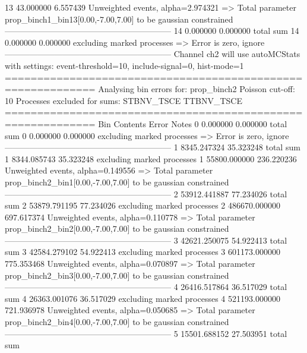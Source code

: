 13         43.000000       6.557439        Unweighted events, alpha=2.974321
  => Total parameter prop_binch1_bin13[0.00,-7.00,7.00] to be gaussian constrained
------------------------------------------------------------
14         0.000000        0.000000        total sum                     
14         0.000000        0.000000        excluding marked processes    
  => Error is zero, ignore      
------------------------------------------------------------
Channel ch2 will use autoMCStats with settings: event-threshold=10, include-signal=0, hist-mode=1
============================================================
Analysing bin errors for: prop_binch2
Poisson cut-off: 10
Processes excluded for sums: STBNV_TSCE TTBNV_TSCE
============================================================
Bin        Contents        Error           Notes                         
0          0.000000        0.000000        total sum                     
0          0.000000        0.000000        excluding marked processes    
  => Error is zero, ignore      
------------------------------------------------------------
1          8345.247324     35.323248       total sum                     
1          8344.085743     35.323248       excluding marked processes    
1          55800.000000    236.220236      Unweighted events, alpha=0.149556
  => Total parameter prop_binch2_bin1[0.00,-7.00,7.00] to be gaussian constrained
------------------------------------------------------------
2          53912.441887    77.234026       total sum                     
2          53879.791195    77.234026       excluding marked processes    
2          486670.000000   697.617374      Unweighted events, alpha=0.110778
  => Total parameter prop_binch2_bin2[0.00,-7.00,7.00] to be gaussian constrained
------------------------------------------------------------
3          42621.250075    54.922413       total sum                     
3          42584.279102    54.922413       excluding marked processes    
3          601173.000000   775.353468      Unweighted events, alpha=0.070897
  => Total parameter prop_binch2_bin3[0.00,-7.00,7.00] to be gaussian constrained
------------------------------------------------------------
4          26416.517864    36.517029       total sum                     
4          26363.001076    36.517029       excluding marked processes    
4          521193.000000   721.936978      Unweighted events, alpha=0.050685
  => Total parameter prop_binch2_bin4[0.00,-7.00,7.00] to be gaussian constrained
------------------------------------------------------------
5          15501.688152    27.503951       total sum                     
